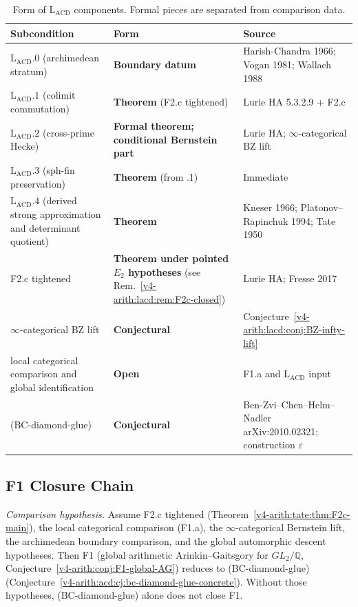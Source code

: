 \begin{table}[h]
\centering
\small
\begin{tabular}{@{}>{\raggedright\arraybackslash}p{}|>{\raggedright\arraybackslash}p{}|>{\raggedright\arraybackslash}p{}@{}}
Subcondition & Form & Source \\
\hline
\(\mathrm{L}_{\mathrm{ACD}}.0\) (archimedean stratum) & \textbf{Boundary datum} & Harish-Chandra 1966; Vogan 1981; Wallach 1988 \\
\(\mathrm{L}_{\mathrm{ACD}}.1\) (colimit commutation) & \textbf{Theorem} (F2.c tightened) & Lurie HA 5.3.2.9 + F2.c \\
\(\mathrm{L}_{\mathrm{ACD}}.2\) (cross-prime Hecke) & \textbf{Formal theorem; conditional Bernstein part} & Lurie HA; \(\infty\)-categorical BZ lift \\
\(\mathrm{L}_{\mathrm{ACD}}.3\) (sph-fin preservation) & \textbf{Theorem} (from .1) & Immediate \\
\(\mathrm{L}_{\mathrm{ACD}}.4\) (derived strong approximation and determinant quotient) & \textbf{Theorem} & Kneser 1966; Platonov--Rapinchuk 1994; Tate 1950 \\
F2.c tightened & \textbf{Theorem under pointed \(E_{2}\) hypotheses} (see Rem.~\ref{v4-arith:lacd:rem:F2c-closed}) & Lurie HA; Fresse 2017 \\
\(\infty\)-categorical BZ lift & \textbf{Conjectural} & Conjecture~\ref{v4-arith:lacd:conj:BZ-infty-lift} \\
local categorical comparison and global identification & \textbf{Open} & F1.a and \(\mathrm{L}_{\mathrm{ACD}}\) input \\
(BC-diamond-glue) & \textbf{Conjectural} & Ben-Zvi--Chen--Helm--Nadler arXiv:2010.02321; construction \(\varepsilon\) \\
\end{tabular}
\caption{Form of \(\mathrm{L}_{\mathrm{ACD}}\) components. Formal
pieces are separated from comparison data.}
\label{v4-arith:lacd:tbl:form}
\end{table}

\subsection{F1 Closure Chain}

\begin{theorem}
\label{v4-arith:lacd:thm:F1-residual}
\emph{Comparison hypothesis.} Assume F2.c tightened
(Theorem~\ref{v4-arith:tate:thm:F2c-main}), the local categorical
comparison (F1.a), the \(\infty\)-categorical Bernstein lift, the
archimedean boundary comparison, and the global automorphic descent
hypotheses.
Then F1 (global arithmetic
Arinkin--Gaitsgory for \(GL_{2}/\mathbb{Q}\),
Conjecture~\ref{v4-arith:conj:F1-global-AG}) reduces to
(BC-diamond-glue) (Conjecture~\ref{v4-arith:acd:cj:bc-diamond-glue-concrete}).
Without those hypotheses, (BC-diamond-glue) alone does not close F1.
\end{theorem}

